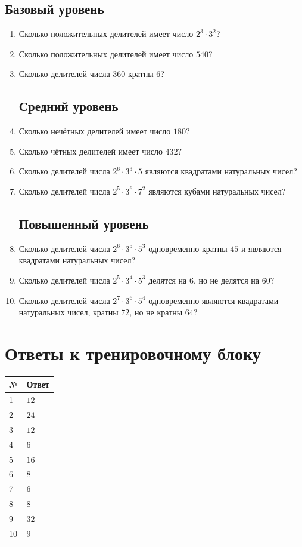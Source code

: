 \documentclass[a4paper,12pt]{article}
\begin{document}
\subsection*{Базовый уровень}
\begin{enumerate}[label=\textcolor{accent}{\textbf{\arabic*.}},start=1]
\item Сколько положительных делителей имеет число $2^3\cdot3^2$?
\item Сколько положительных делителей имеет число $540$?
\item Сколько делителей числа $360$ кратны $6$?
\subsection*{Средний уровень}
\item Сколько нечётных делителей имеет число $180$?
\item Сколько чётных делителей имеет число $432$?
\item Сколько делителей числа $2^6\cdot3^3\cdot5$ являются квадратами натуральных чисел?
\item Сколько делителей числа $2^5\cdot3^6\cdot7^2$ являются кубами натуральных чисел?
\subsection*{Повышенный уровень}
\item Сколько делителей числа $2^6\cdot3^5\cdot5^3$ одновременно кратны $45$ и являются квадратами натуральных чисел?
\item Сколько делителей числа $2^5\cdot3^4\cdot5^3$ делятся на $6$, но не делятся на $60$?
\item Сколько делителей числа $2^7\cdot3^6\cdot5^4$ одновременно являются квадратами натуральных чисел, кратны $72$, но не кратны $64$?
\end{enumerate}

\clearpage
\section*{\textcolor{darkaccent}{Ответы к тренировочному блоку}}
\vspace{7mm}
\begin{center}
\begin{tabular}{@{}p{25mm}p{105mm}@{}}
\toprule
\textbf{№} & \textbf{Ответ}\\
\midrule
1 & $12$\\
2 & $24$\\
3 & $12$\\
4 & $6$\\
5 & $16$\\
6 & $8$\\
7 & $6$\\
8 & $8$\\
9 & $32$\\
10 & $9$\\
\bottomrule
\end{tabular}
\end{center}
\vspace{13mm}
\end{document}
